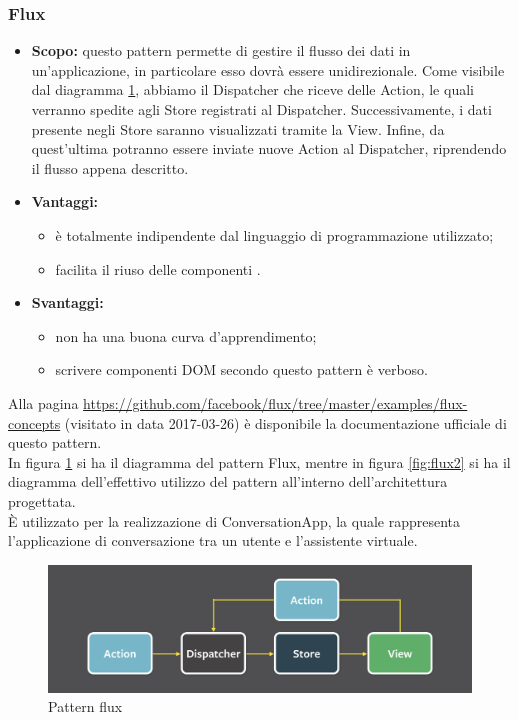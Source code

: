     \subsubsection{Flux}
    \begin{itemize}
    	\item \textbf{Scopo:} questo pattern permette di gestire il flusso dei dati in un'applicazione, in particolare esso dovrà essere unidirezionale. Come visibile dal diagramma \ref{fig:flux}, abbiamo il Dispatcher che riceve delle Action, le quali verranno spedite agli Store registrati al Dispatcher. Successivamente, i dati presente negli Store saranno visualizzati tramite la View. Infine, da quest'ultima potranno essere inviate nuove Action al Dispatcher, riprendendo il flusso appena descritto.
    	\item \textbf{Vantaggi:}
    	\begin{itemize}
    		\item è totalmente indipendente dal linguaggio di programmazione utilizzato;
    		\item facilita il riuso delle componenti .
    	\end{itemize}
    	\item \textbf{Svantaggi:}
    	\begin{itemize}
    		\item non ha una buona curva d'apprendimento;
    		\item scrivere componenti DOM secondo questo pattern è verboso.
    	\end{itemize}
    \end{itemize}
    Alla pagina \url{https://github.com/facebook/flux/tree/master/examples/flux-concepts} (visitato in data 2017-03-26) è disponibile la documentazione ufficiale di questo pattern.\\
    In figura \ref{fig:flux} si ha il diagramma del pattern Flux, mentre in figura \ref{fig:flux2} si ha il diagramma dell'effettivo utilizzo del pattern all'interno dell'architettura progettata.\\
È utilizzato per la realizzazione di ConversationApp, la quale rappresenta l'applicazione di conversazione tra un utente e l'assistente virtuale.
    \begin{figure}[h]
    	\centering
    	\includegraphics[width=\textwidth,height=\textheight,keepaspectratio]{images/fluxpattern.png}
    	\caption{Pattern flux}\label{fig:flux}
    \end{figure}
